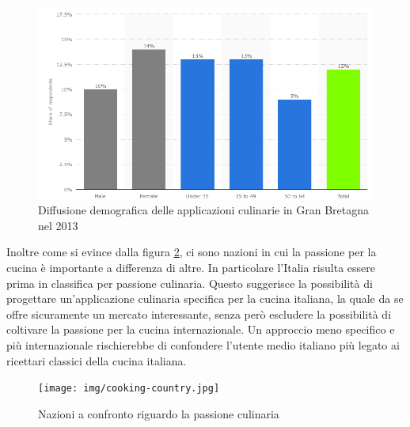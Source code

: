 \begin{itemize}
\begin{figure}[H]
	\centering
	\includegraphics[scale=0.3]{img/demographic-cookapp.png}
	\caption{Diffusione demografica delle applicazioni culinarie in Gran Bretagna nel
2013}	
	\label{fig:demographic-cookapp}
\end{figure}

Inoltre come si evince dalla figura \ref{fig:cooking-country}, ci sono
nazioni in cui la passione per la cucina è importante a differenza di
altre. In particolare l'Italia risulta essere prima in classifica per
passione culinaria.
Questo suggerisce la possibilità di progettare un'applicazione culinaria
specifica per la cucina italiana, la quale da se offre sicuramente un mercato
interessante, senza però escludere la possibilità di
coltivare la passione per la cucina internazionale. 
Un approccio meno specifico e più internazionale rischierebbe di
confondere l'utente medio italiano più legato ai ricettari classici
della cucina italiana. 

\begin{figure}[H]
	\centering
	\texttt{[image: img/cooking-country.jpg]}
	\caption{Nazioni a confronto riguardo la passione culinaria}	
	\label{fig:cooking-country}
\end{figure}

\end{itemize}

